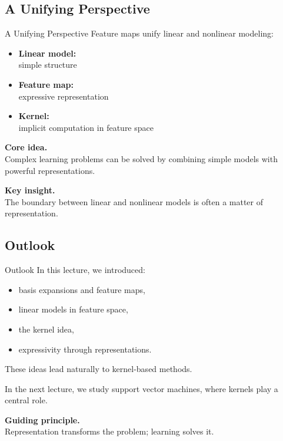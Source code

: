 \documentclass[aspectratio=169,11pt]{beamer}
\begin{document}
\subsection{A Unifying Perspective}
\begin{frame}[t,allowframebreaks]{A Unifying Perspective}
\small
Feature maps unify linear and nonlinear modeling:

\begin{itemize}
    \item \textbf{Linear model:}\\ simple structure
    \item \textbf{Feature map:}\\ expressive representation
    \item \textbf{Kernel:}\\ implicit computation in feature space
\end{itemize}

\textbf{Core idea.}\\ Complex learning problems can be solved by combining simple models with powerful representations.

\textbf{Key insight.}\\ The boundary between linear and nonlinear models is often a matter of representation.
\end{frame}

\subsection{Outlook}
\begin{frame}[t,allowframebreaks]{Outlook}
\small
In this lecture, we introduced:

\begin{itemize}
    \item basis expansions and feature maps,
    \item linear models in feature space,
    \item the kernel idea,
    \item expressivity through representations.
\end{itemize}

These ideas lead naturally to kernel-based methods.

In the next lecture, we study support vector machines, where kernels play a central role.

\textbf{Guiding principle.}\\ Representation transforms the problem; learning solves it.
\end{frame}
\end{document}
